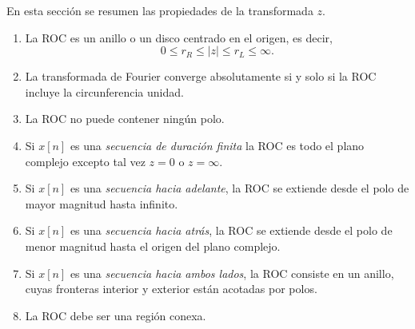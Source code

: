 \documentclass[a4paper]{report}
\begin{document}
En esta sección se resumen las propiedades de la transformada \(z\).
\begin{enumerate}
 \item La ROC es un anillo o un disco centrado en el origen, es decir,
\[
  0\leq r_R \leq |z| \leq r_L \leq \infty.
\]
\item La transformada de Fourier converge absolutamente si y solo si la ROC incluye la circunferencia unidad.
\item La ROC no puede contener ningún polo.
\item Si \(x[n]\) es una \emph{secuencia de duración finita} la ROC es todo el plano complejo excepto tal vez \(z=0\) o \(z=\infty\).
\item Si \(x[n]\) es una \emph{secuencia hacia adelante}, la ROC se extiende desde el polo de mayor magnitud hasta infinito.
\item Si \(x[n]\) es una \emph{secuencia hacia atrás}, la ROC se extiende desde el polo de menor magnitud hasta el origen del plano complejo.
\item Si \(x[n]\) es una \emph{secuencia hacia ambos lados}, la ROC consiste en un anillo, cuyas fronteras interior y exterior están acotadas por polos.
\item La ROC debe ser una región conexa.
\end{enumerate}
\end{document}
